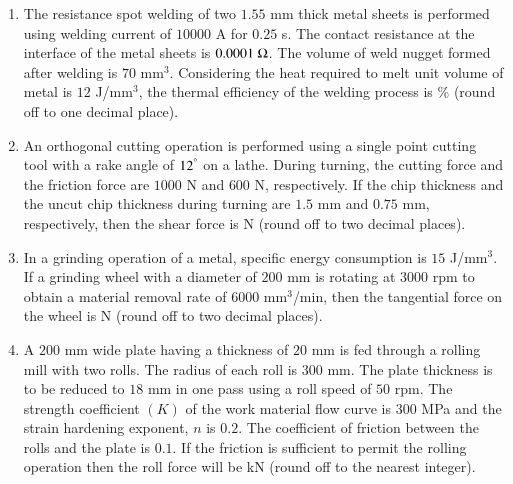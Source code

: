 \documentclass[journal]{IEEEtran}
\begin{document}
\begin{enumerate}
\hfill{}

\item The resistance spot welding of two $1.55$ mm thick metal sheets is performed
using welding current of $10000$ A for $0.25$ s. The contact resistance at the
interface of the metal sheets is $0.0001~\ohm$. The volume of weld nugget formed after welding is $70$ mm$^3$. Considering the heat required to melt unit volume of metal is $12$ J/mm$^3$, the thermal efficiency of the welding process is \underline{\hspace{2cm}} \% (round off to one decimal place).

\hfill{}

\item An orthogonal cutting operation is performed using a single point cutting
tool with a rake angle of $12^\degree$ on a lathe. During turning, the cutting force and the friction force are $1000$ N and $600$ N, respectively. If the chip thickness and the uncut chip thickness during turning are $1.5$ mm and $0.75$ mm, respectively, then the shear force is \underline{\hspace{2cm}} N (round off to two decimal places).

\hfill{}

\item In a grinding operation of a metal, specific energy consumption is $15$ J/mm$^3$. If a grinding wheel with a diameter of $200$ mm is rotating at $3000$ rpm to obtain a material removal rate of $6000$ mm$^3$/min, then the tangential force on the wheel is \underline{\hspace{2cm}} N (round off to two decimal places).

\hfill{}

\item A $200$ mm wide plate having a thickness of $20$ mm is fed through a rolling
mill with two rolls. The radius of each roll is $300$ mm. The plate thickness is to be reduced to $18$ mm in one pass using a roll speed of $50$ rpm. The strength coefficient $(K)$ of the work material flow curve is $300$ MPa and the strain hardening exponent, $n$ is $0.2$. The coefficient of friction between the rolls and the plate is $0.1$. If the friction is sufficient to permit the rolling operation then the roll force will be \underline{\hspace{2cm}} kN (round off to the nearest integer).

\hfill{}


\end{enumerate}
\end{document}
